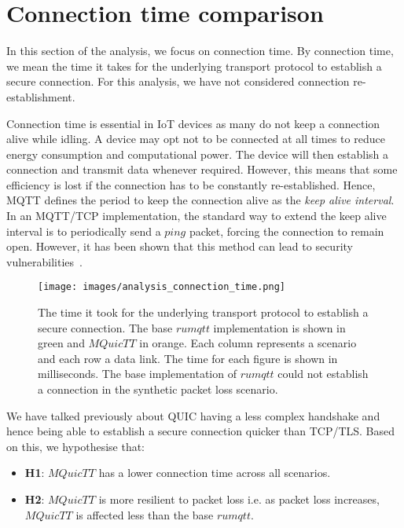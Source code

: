 \section{Connection time comparison} \label{sec:conn_time}

In this section of the analysis, we focus on connection time.
By connection time, we mean the time it takes for the underlying transport protocol to establish a secure connection.
For this analysis, we have not considered connection re-establishment.

Connection time is essential in IoT devices as many do not keep a connection alive while idling.
A device may opt not to be connected at all times to reduce energy consumption and computational power.
The device will then establish a connection and transmit data whenever required.
However, this means that some efficiency is lost if the connection has to be constantly re-established.
Hence, MQTT defines the period to keep the connection alive as the \textit{keep alive interval}.
In an MQTT/TCP implementation, the standard way to extend the keep alive interval is to periodically send a $ping$ packet, forcing the connection to remain open.
However, it has been shown that this method can lead to security vulnerabilities~\citep{vaccari_slowtt_2020,mileva_comprehensive_2021}.

\begin{figure}
    \centering
    \texttt{[image: images/analysis\_connection\_time.png]}
    \caption{The time it took for the underlying transport protocol to establish a secure connection.
    The base $rumqtt$ implementation is shown in green and $MQuicTT$ in orange.
    Each column represents a scenario and each row a data link.
    The time for each figure is shown in milliseconds. The base implementation of $rumqtt$ could not establish a connection in the synthetic packet loss scenario.}
    \label{fig:connection_time}
\end{figure}

We have talked previously about QUIC having a less complex handshake and hence being able to establish a secure connection quicker than TCP/TLS.
Based on this, we hypothesise that:

\begin{itemize}
    \item \textbf{H1}: $MQuicTT$ has a lower connection time across all scenarios.
    \item \textbf{H2}: $MQuicTT$ is more resilient to packet loss i.e. as packet loss increases, $MQuicTT$ is affected less than the base $rumqtt$.
\end{itemize}

